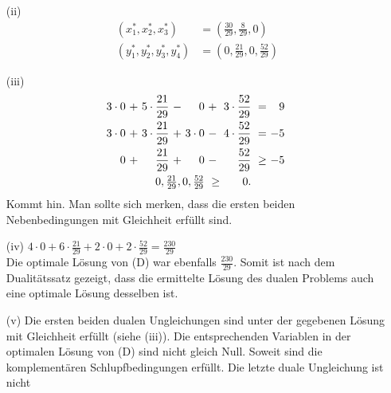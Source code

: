 \documentclass [a4paper,11pt]{article}
\begin{document}
\begin{enumerate}
\begin{enumerate}
\begin{enumerate}
            \item[(ii)]
                \begin{align*}
                (x_1^*,x_2^*,x_3^*) &= (\frac{30}{29},\frac{8}{29},0) \\
                (y_1^*,y_2^*,y_3^*,y_4^*) &= (0,\frac{21}{29},0,\frac{52}{29})
                \end{align*}
            \item[(iii)]
                \begin{align*}
                \begin{alignedat}{6}
                &&  3 \cdot 0 &\ + &\ 5 \cdot \frac{21}{29} &\ - &\         0 &\ + &\ 3 \cdot \frac{52}{29} &\    = &\  9\ \\
                &&  3 \cdot 0 &\ + &\ 3 \cdot \frac{21}{29} &\ + &\ 3 \cdot 0 &\ - &\ 4 \cdot \frac{52}{29} &\    = &\ -5\ \\
                &&          0 &\ + &\         \frac{21}{29} &\ + &\         0 &\ - &\         \frac{52}{29} &\ \geq &\ -5\ \\
                && & & & & \llap{$0,\frac{21}{29},0,\frac{52}{29}$} &\ \geq &\ 0.
                \end{alignedat}
                \end{align*}
                Kommt hin. Man sollte sich merken, dass die ersten beiden Nebenbedingungen mit Gleichheit erfüllt sind.
            \item[(iv)]
                $ 4 \cdot 0 + 6 \cdot \frac{21}{29} + 2 \cdot 0 + 2 \cdot \frac{52}{29} = \frac{230}{29} $\\
                Die optimale Lösung von (D) war ebenfalls $\frac{230}{29}$. Somit ist nach dem Dualitätssatz gezeigt, dass die ermittelte Lösung des dualen Problems
                auch eine optimale Lösung desselben ist.
            \item[(v)]
                Die ersten beiden dualen Ungleichungen sind unter der gegebenen Lösung mit Gleichheit erfüllt (siehe (iii)). Die entsprechenden Variablen in der
                optimalen Lösung von (D) sind nicht gleich Null. Soweit sind die komplementären Schlupfbedingungen erfüllt. Die letzte duale Ungleichung ist nicht

\end{enumerate}
\end{enumerate}
\end{enumerate}
\end{document}
